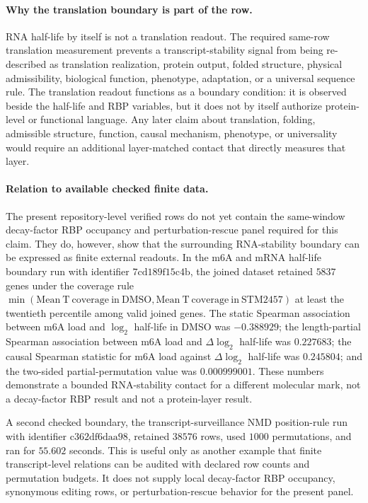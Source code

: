 \paragraph{Why the translation boundary is part of the row.}
RNA half-life by itself is not a translation readout.  The required same-row translation measurement prevents a transcript-stability signal from being re-described as translation realization, protein output, folded structure, physical admissibility, biological function, phenotype, adaptation, or a universal sequence rule.  The translation readout functions as a boundary condition: it is observed beside the half-life and RBP variables, but it does not by itself authorize protein-level or functional language.  Any later claim about translation, folding, admissible structure, function, causal mechanism, phenotype, or universality would require an additional layer-matched contact that directly measures that layer.

\paragraph{Relation to available checked finite data.}
The present repository-level verified rows do not yet contain the same-window decay-factor RBP occupancy and perturbation-rescue panel required for this claim.  They do, however, show that the surrounding RNA-stability boundary can be expressed as finite external readouts.  In the m6A and mRNA half-life boundary run with identifier $7\mathrm{cd}189\mathrm{f}15\mathrm{c}4\mathrm{b}$, the joined dataset retained $5837$ genes under the coverage rule $\min(\mathrm{Mean\ T\ coverage\ in\ DMSO},\mathrm{Mean\ T\ coverage\ in\ STM2457})$ at least the twentieth percentile among valid joined genes.  The static Spearman association between m6A load and $\log_2$ half-life in DMSO was $-0.388929$; the length-partial Spearman association between m6A load and $\Delta\log_2$ half-life was $0.227683$; the causal Spearman statistic for m6A load against $\Delta\log_2$ half-life was $0.245804$; and the two-sided partial-permutation value was $0.000999001$.  These numbers demonstrate a bounded RNA-stability contact for a different molecular mark, not a decay-factor RBP result and not a protein-layer result.

A second checked boundary, the transcript-surveillance NMD position-rule run with identifier $\mathrm{c}362\mathrm{df}6\mathrm{daa}98$, retained $38576$ rows, used $1000$ permutations, and ran for $55.602$ seconds.  This is useful only as another example that finite transcript-level relations can be audited with declared row counts and permutation budgets.  It does not supply local decay-factor RBP occupancy, synonymous editing rows, or perturbation-rescue behavior for the present panel.


